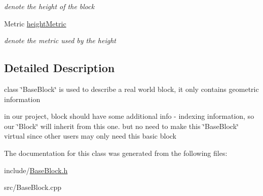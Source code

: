\begin{DoxyCompactItemize}
\begin{DoxyCompactList}\small\item\em denote the height of the block \end{DoxyCompactList}\item 
\hypertarget{classBaseBlock_a8a9eef1f6be21bcf114e3aba3e0b4fb1}{\-Metric \hyperlink{classBaseBlock_a8a9eef1f6be21bcf114e3aba3e0b4fb1}{height\-Metric}}\label{classBaseBlock_a8a9eef1f6be21bcf114e3aba3e0b4fb1}

\begin{DoxyCompactList}\small\item\em denote the metric used by the height \end{DoxyCompactList}\end{DoxyCompactItemize}


\subsection{\-Detailed \-Description}
class \char`\"{}\-Base\-Block\char`\"{} is used to describe a real world block, it only contains geometric information 

in our project, block should have some additional info -\/ indexing information, so our \char`\"{}\-Block\char`\"{} will inherit from this one. but no need to make this \char`\"{}\-Base\-Block\char`\"{} virtual since other users may only need this basic block 

\-The documentation for this class was generated from the following files\-:\begin{DoxyCompactItemize}
\item 
include/\hyperlink{BaseBlock_8h}{\-Base\-Block.\-h}\item 
src/\-Base\-Block.\-cpp\end{DoxyCompactItemize}
